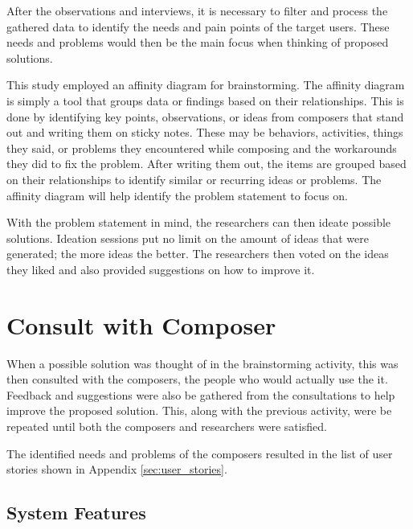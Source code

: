 		After the observations and interviews, it is necessary to filter and process the gathered data to identify the needs and pain points of the target users. These needs and problems would then be the main focus when thinking of proposed solutions. 

		This study employed an affinity diagram for brainstorming. The affinity diagram is simply a tool that groups data or findings based on their relationships. This is done by identifying key points, observations, or ideas from composers that stand out and writing them on sticky notes. These may be behaviors, activities, things they said, or problems they encountered while composing and the workarounds they did to fix the problem. After writing them out, the items are grouped based on their relationships to identify similar or recurring ideas or problems. The affinity diagram will help identify the problem statement to focus on.

		With the problem statement in mind, the researchers can then ideate possible solutions. Ideation sessions put no limit on the amount of ideas that were generated; the more ideas the better. The researchers then voted on the ideas they liked and also provided suggestions on how to improve it. 

	\section{Consult with Composer}

		When a possible solution was thought of in the brainstorming activity, this was then consulted with the composers, the people who would actually use the it. Feedback and suggestions were also be gathered from the consultations to help improve the proposed solution. This, along with the previous activity, were be repeated until both the composers and researchers were satisfied.

		The identified needs and problems of the composers resulted in the list of user stories shown in Appendix \ref{sec:user_stories}.

		\subsection{System Features}

